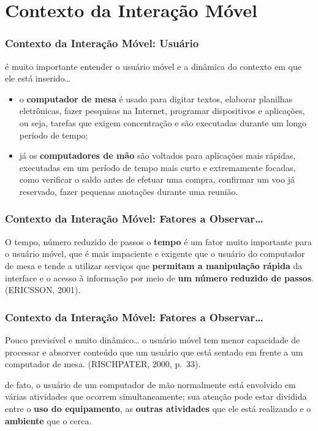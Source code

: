 \documentclass[presentation]{beamer}
\begin{document}
\section{Contexto da Interação Móvel} %
\label{sec:contexto_da_interacao_movel}

\begin{frame}[c]\frametitle{Contexto da Interação Móvel: Usuário}
    
    é muito importante entender o usuário móvel e a dinâmica do contexto em que ele está inserido\ldots

    \begin{itemize}
        \item  o \textbf{computador de mesa} é usado para digitar textos, elaborar planilhas eletrônicas, fazer pesquisas na Internet, programar dispositivos e aplicações, ou seja, tarefas que exigem concentração e são executadas durante um longo período de tempo;
        \item já os \textbf{computadores de mão} são voltados para aplicações mais rápidas, executadas em um período de tempo mais curto e extremamente focadas, como verificar o saldo antes de efetuar uma compra, confirmar um voo já reservado, fazer pequenas anotações durante uma reunião.
    \end{itemize}

\end{frame}

\begin{frame}[c]\frametitle{Contexto da Interação Móvel: Fatores a Observar\ldots}

    \begin{block}{O tempo, número reduzido de passos}
    o \textbf{tempo} é um fator muito importante para o usuário móvel, que é mais impaciente e exigente que o usuário do computador de mesa e tende a utilizar serviços que \textbf{permitam a manipulação rápida} da interface e o acesso à informação por meio de \textbf{um número reduzido de passos}. (ERICSSON, 2001).
\end{block}

\end{frame}


\begin{frame}[c]\frametitle{Contexto da Interação Móvel: Fatores a Observar\ldots}

    \begin{block}{Pouco previsível e muito dinâmico\ldots}
    o usuário móvel tem menor capacidade de processar e absorver conteúdo que um usuário que está sentado em frente a um computador de mesa. (RISCHPATER, 2000, p.~33).
    \end{block}
    
    de fato, o usuário de um computador de mão normalmente está envolvido em várias atividades que ocorrem simultaneamente; sua atenção pode estar dividida entre o \textbf{uso do equipamento}, as \textbf{outras atividades} que ele está realizando e o \textbf{ambiente} que o cerca.

\end{frame}
\end{document}
